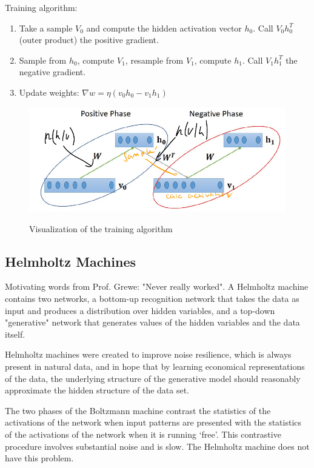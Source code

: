 \documentclass[main]{subfiles}
\begin{document}
Training algorithm:
\begin{enumerate}
    \item Take a sample $V_0$ and compute the hidden activation vector $h_0$. Call $V_0 h_0^T$ (outer product) the positive gradient.
    \item Sample from $h_0$, compute $V_1$, resample from $V_1$, compute $h_1$. Call $V_1 h_1^T$ the negative gradient.
    \item Update weights: $\nabla w = \eta (v_0h_0 - v_1h_1)$
\end{enumerate}

\begin{figure}[H]
	\centering
	\includegraphics[width=0.9\linewidth]{07_UnsupervisedAndSelfsupervisedLearning/figures/boltzmann-contr-div.png}
	\label{fig:boltzmann-contr-div}
	\caption{Visualization of the training algorithm}
\end{figure}

\subsection{Helmholtz Machines}
Motivating words from Prof. Grewe: "Never really worked".
A Helmholtz machine contains two networks, a bottom-up recognition network that takes the data as input and produces a distribution over hidden variables, and a top-down "generative" network that generates values of the hidden variables and the data itself.

Helmholtz machines were created to improve noise resilience, which is always present in natural data, and in hope that by learning economical representations of the data, the underlying structure of the generative model should reasonably approximate the hidden structure of the data set. 

The two phases of the Boltzmann machine contrast the statistics of the activations of the network when input patterns are presented with the statistics of the activations of the network when it is running ‘free’. This contrastive procedure involves substantial noise and is slow. The Helmholtz machine does not have this problem.
\end{document}
